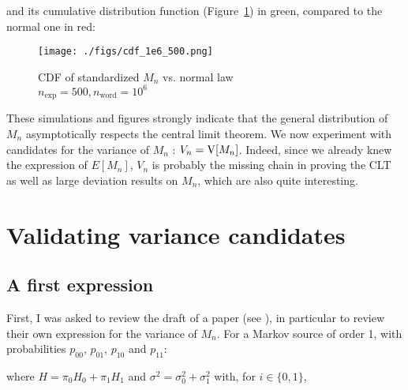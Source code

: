 	\noindent
	 and its cumulative distribution function (Figure~\ref{fig:cdf}) 
	 in green, compared to the normal one in red:
 	
	  \begin{figure}[H]
		\centering
        \texttt{[image: ./figs/cdf\_1e6\_500.png]}
		\caption{CDF of standardized $M_n$ vs. normal law\\
				$n_{\text{exp}} = 500, n_{\text{word}} = 10^6$}
		\label{fig:cdf}
	  \end{figure} 
	
	
	These simulations and figures strongly indicate that the general distribution
	of $M_n$ asymptotically respects the central limit theorem. We now experiment with
	candidates for the variance of $M_n$ : $V_n = \operatorname{V}[M_n]$. Indeed, since we already knew 
	the expression of $E[M_n]$, $V_n$ is probably the missing chain in 
	proving the CLT as well as large deviation results on $M_n$, which 
	are also quite interesting.


	
	
	\section{Validating variance candidates}
	\subsection{A first expression}

	First, I was asked to review the draft of a paper (see \cite{leckey_probabilistic_2018}),
	in particular to review their own expression for the variance of $M_n$. 
	For a Markov source of order 1, with probabilities 
	$p_{0 0},\, p_{0 1},\, p_{1 0}$ and $p_{1 1}$:

		
	\noindent
	where $H = \pi_0 H_0 + \pi_1 H_1 $ and $\sigma^2 = \sigma_0^2 + \sigma_1^2$ with, for $i\in\{0,1\}$,
	
